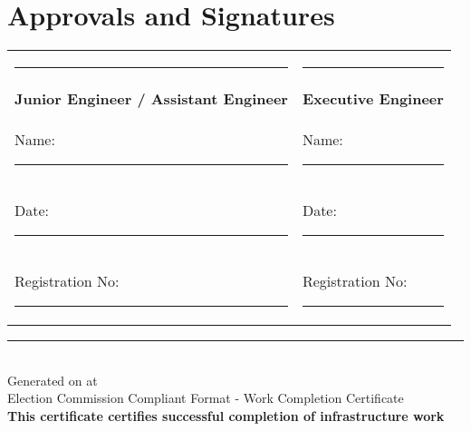 \documentclass[12pt,a4paper]{article}
\begin{document}
\vspace{1.5cm}
\section*{Approvals and Signatures}

\begin{center}
\begin{tabular}{p{7cm}p{7cm}}
\rule{6cm}{0.5pt} & \rule{6cm}{0.5pt} \\
\textbf{Junior Engineer / Assistant Engineer} & \textbf{Executive Engineer} \\
Name: \rule{4cm}{0.5pt} & Name: \rule{4cm}{0.5pt} \\
Date: \rule{4cm}{0.5pt} & Date: \rule{4cm}{0.5pt} \\
Registration No: \rule{3cm}{0.5pt} & Registration No: \rule{3cm}{0.5pt} \\
\end{tabular}
\end{center}

\vspace{2cm}
\begin{center}
\end{center}

\vspace{1cm}
\begin{center}
\rule{\textwidth}{1pt}\\
\small
Generated on  at \\
Election Commission Compliant Format - Work Completion Certificate\\
\textbf{This certificate certifies successful completion of infrastructure work}
\end{center}
\end{document}
